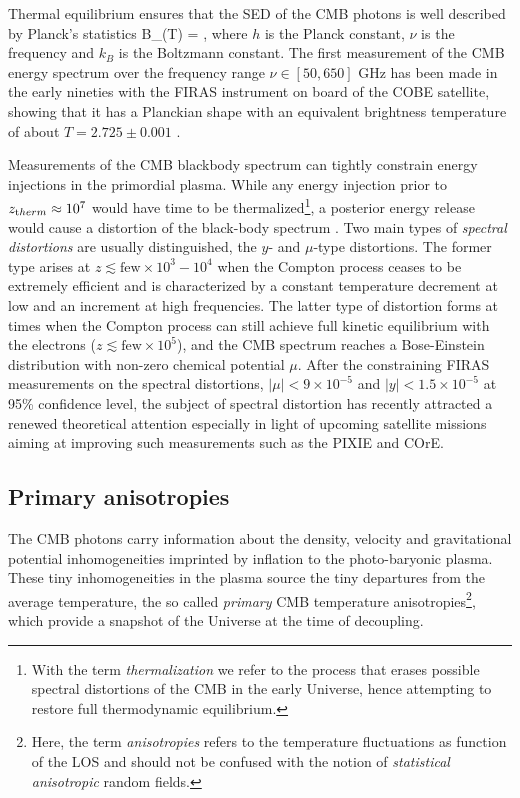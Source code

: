 Thermal equilibrium ensures that the \gls{SED} of the \gls{CMB} photons is well described by Planck's 
statistics
%
\be
\label{eq:cmb_SED}
B_{\nu}(T) = ,
\ee
%
where $h$ is the Planck constant, $\nu$ is the frequency and $k_B$ is the Boltzmann constant. The first
measurement of the \gls{CMB} energy spectrum over the frequency range $\nu \in [50,650]$ GHz has 
been made in the early nineties with the \gls{FIRAS} instrument \citep{Mather1994} on board of the  \gls{COBE} satellite, showing that it has a Planckian shape with an equivalent 
brightness temperature of about $T = 2.725 \pm 0.001$ \citep{Fixsen1996}.

 Measurements of the 
\gls{CMB} blackbody spectrum can tightly constrain energy injections in the primordial plasma. While
any energy injection prior to $z_{\rm therm} \approx 10^7$ would have time to be thermalized\footnote{With the term \emph{thermalization} we refer to the process that erases possible spectral distortions of
the CMB in the early Universe, hence attempting to restore full thermodynamic equilibrium.}, a posterior
energy release would cause a distortion of the black-body spectrum \citep{Danese1982,Burigana1991}.
Two main types of \emph{spectral distortions} are usually distinguished, the $y$- and $\mu$-type 
distortions. The former type arises at $z \lesssim \text{few}\times 10^3-10^4$ when the Compton
process ceases to be extremely efficient and is characterized by a
constant temperature decrement at low and an increment at high frequencies. The latter type of distortion 
forms at times when the Compton process can still achieve full kinetic equilibrium
with the electrons ($z \lesssim \text{few} \times 10^5$), and the CMB spectrum reaches a Bose-Einstein 
distribution with non-zero chemical potential $\mu$. 
After the constraining \gls{FIRAS} measurements on the spectral distortions, $|\mu | < 9 \times 10^{-5}$ and $|y|<1.5\times 10^{-5}$ at 95\% confidence level, the subject of spectral distortion has recently attracted a renewed theoretical attention \citep{Chluba2012,Chluba2014} especially in light of upcoming satellite missions aiming at improving such measurements such as the \gls{PIXIE} \citep{Kogut2011} and \gls{COrE}. 

\subsection{Primary anisotropies}
\label{sec:cmb_prim}
The \gls{CMB} photons carry information about the density, velocity and gravitational potential inhomogeneities 
imprinted by inflation to the photo-baryonic plasma. These tiny inhomogeneities in the plasma source the tiny departures from the average temperature, the so called \emph{primary} \gls{CMB} temperature anisotropies\footnote{Here, the term \emph{anisotropies} refers to the temperature fluctuations as function of the \gls{LOS} and should not be confused with the notion of \emph{statistical anisotropic} random fields.}, which provide
a snapshot of the Universe at the time of decoupling. 

